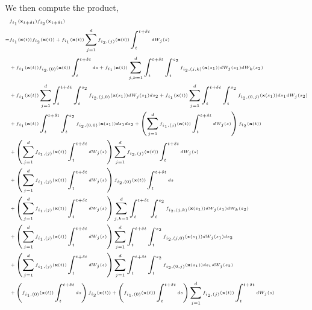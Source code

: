 %
We then compute the product,
%
\begin{equation}
\tiny
\begin{aligned}
&f_{i_1}(\mathbf{x}_{t + \delta t}) f_{i_2}(\mathbf{x}_{t + \delta t}) \\
=& 
f_{i_1}(\mathbf{x}(t)) f_{i_2}(\mathbf{x}(t)) 
+  f_{i_1}(\mathbf{x}(t)) \sum_{j=1}^\lowdim f_{{i_2},(j)}(\mathbf{x}(t)) \int_t^{t + \delta t} dW_j(s) \\
&+  f_{i_1}(\mathbf{x}(t)) f_{{i_2},(0)}(\mathbf{x}(t)) \int_t^{t + \delta t} ds
+ f_{i_1}(\mathbf{x}(t)) \sum_{j, k=1}^\lowdim \int_t^{t+\delta t} \int_t^{s_2} f_{{i_2}, (j,k)}(\mathbf{x}(s_1)) dW_j(s_1) dW_k(s_2) \\
&+ f_{i_1}(\mathbf{x}(t)) \sum_{j=1}^\lowdim \int_t^{t+\delta t} \int_t^{s_2} f_{{i_2}, (j,0)}(\mathbf{x}(s_1)) dW_j(s_1) ds_2 
+ f_{i_1}(\mathbf{x}(t)) \sum_{j=1}^\lowdim \int_t^{t+\delta t} \int_t^{s_2} f_{{i_2}, (0,j)}(\mathbf{x}(s_1)) ds_1 dW_j(s_2) \\
&+ f_{i_1}(\mathbf{x}(t)) \int_t^{t+\delta t} \int_t^{s_2} f_{{i_2}, (0,0)}(\mathbf{x}(s_1)) ds_1 ds_2 
+ \left( \sum_{j=1}^\lowdim f_{{i_1},(j)}(\mathbf{x}(t)) \int_t^{t + \delta t} dW_j(s) \right) f_{i_2}(\mathbf{x}(t)) \\
&+ \left( \sum_{j=1}^\lowdim f_{{i_1},(j)}(\mathbf{x}(t)) \int_t^{t + \delta t} dW_j(s) \right) \sum_{j=1}^\lowdim f_{{i_2},(j)}(\mathbf{x}(t)) \int_t^{t + \delta t} dW_j(s) \\
& +  \left(\sum_{j=1}^\lowdim f_{{i_1},(j)}(\mathbf{x}(t)) \int_t^{t + \delta t} dW_j(s) \right)f_{{i_2},(0)}(\mathbf{x}(t)) \int_t^{t + \delta t} ds \\
&+ \left(\sum_{j=1}^\lowdim f_{{i_1},(j)}(\mathbf{x}(t)) \int_t^{t + \delta t} dW_j(s) \right) \sum_{j, k=1}^\lowdim \int_t^{t+\delta t} \int_t^{s_2} f_{{i_2},(j,k)}(\mathbf{x}(s_1)) dW_j(s_1) dW_k(s_2) \\
&+ \left(\sum_{j=1}^\lowdim f_{{i_1},(j)}(\mathbf{x}(t)) \int_t^{t + \delta t} dW_j(s) \right)\sum_{j=1}^\lowdim \int_t^{t+\delta t} \int_t^{s_2} f_{{i_2},(j,0)}(\mathbf{x}(s_1)) dW_j(s_1) ds_2 \\
&+ \left(\sum_{j=1}^\lowdim f_{{i_1},(j)}(\mathbf{x}(t)) \int_t^{t + \delta t} dW_j(s) \right)\sum_{j=1}^\lowdim \int_t^{t+\delta t} \int_t^{s_2} f_{{i_2},(0,j)}(\mathbf{x}(s_1)) ds_1 dW_j(s_2) \\
&+\left( f_{{i_1},(0)}(\mathbf{x}(t)) \int_t^{t + \delta t} ds \right) f_{i_2}(\mathbf{x}(t)) 
+  \left( f_{{i_1},(0)}(\mathbf{x}(t)) \int_t^{t + \delta t} ds \right)\sum_{j=1}^\lowdim f_{{i_2},(j)}(\mathbf{x}(t)) \int_t^{t + \delta t} dW_j(s) \\

\end{aligned}
\end{equation}
